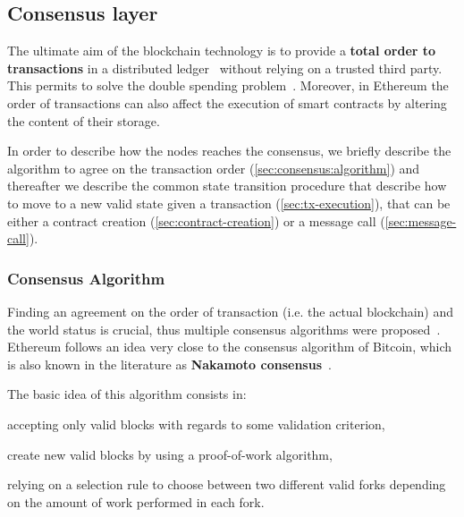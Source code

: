 \subsection{Consensus layer}
\label{sec:consensus}

The ultimate aim of the blockchain technology is to provide a \textbf{total
order to transactions} in a distributed ledger~\cite{bib:the-quest} without
relying on a trusted third party. This permits to solve the double spending
problem~\cite{bib:bitcoin}. Moreover, in Ethereum the order of transactions can
also affect the execution of smart contracts by altering the content of their
storage.

In order to describe how the nodes reaches the consensus, we briefly describe
the algorithm to agree on the transaction order
(\autoref{sec:consensus:algorithm}) and thereafter we describe the common state
transition procedure that describe how to move to a new valid state given a
transaction (\autoref{sec:tx-execution}), that can be either a contract creation
(\autoref{sec:contract-creation}) or a message call
(\autoref{sec:message-call}).


\subsubsection{Consensus Algorithm}
\label{sec:consensus:algorithm}

Finding an agreement on the order of transaction (i.e. the actual blockchain)
and the world status is crucial, thus multiple consensus algorithms were
proposed~\cite{bib:the-quest}. Ethereum follows an idea very close to the
consensus algorithm of Bitcoin, which is also known in the literature as
\textbf{Nakamoto consensus}~\cite{bib:bitcoin-ng}.

The basic idea of this algorithm consists in:
\begin{enumerate*}[label=(\arabic*)]
  \item accepting only valid blocks with regards to some validation criterion,
  \item create new valid blocks by using a proof-of-work algorithm,
  \item relying on a selection rule to choose between two different valid forks
  depending on the amount of work performed in each fork.
\end{enumerate*}

